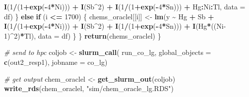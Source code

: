 \documentclass[12pt, twoside]{amherstthesis}
\newenvironment{Shaded}{\begin{snugshade}}{\end{snugshade}}
\newcommand{\AttributeTok}[1]{\textcolor[rgb]{0.13,0.29,0.53}{#1}}
\newcommand{\CommentTok}[1]{\textcolor[rgb]{0.56,0.35,0.01}{\textit{#1}}}
\newcommand{\ControlFlowTok}[1]{\textcolor[rgb]{0.13,0.29,0.53}{\textbf{#1}}}
\newcommand{\DecValTok}[1]{\textcolor[rgb]{0.00,0.00,0.81}{#1}}
\newcommand{\FunctionTok}[1]{\textcolor[rgb]{0.13,0.29,0.53}{\textbf{#1}}}
\newcommand{\NormalTok}[1]{#1}
\newcommand{\OtherTok}[1]{\textcolor[rgb]{0.56,0.35,0.01}{#1}}
\newcommand{\SpecialCharTok}[1]{\textcolor[rgb]{0.81,0.36,0.00}{\textbf{#1}}}
\newcommand{\StringTok}[1]{\textcolor[rgb]{0.31,0.60,0.02}{#1}}
\begin{document}
\begin{Shaded}
\begin{Highlighting}[]
                                \FunctionTok{I}\NormalTok{(}\DecValTok{1}\SpecialCharTok{/}\NormalTok{(}\DecValTok{1}\SpecialCharTok{+}\FunctionTok{exp}\NormalTok{(}\SpecialCharTok{{-}}\DecValTok{4}\SpecialCharTok{*}\NormalTok{Ni))) }\SpecialCharTok{+} \FunctionTok{I}\NormalTok{(Sb}\SpecialCharTok{\^{}}\DecValTok{2}\NormalTok{) }\SpecialCharTok{+} \FunctionTok{I}\NormalTok{(}\DecValTok{1}\SpecialCharTok{/}\NormalTok{(}\DecValTok{1}\SpecialCharTok{+}\FunctionTok{exp}\NormalTok{(}\SpecialCharTok{{-}}\DecValTok{4}\SpecialCharTok{*}\NormalTok{Sn))) }\SpecialCharTok{+}
\NormalTok{                                Hg}\SpecialCharTok{:}\NormalTok{Ni}\SpecialCharTok{:}\NormalTok{Tl, }\AttributeTok{data =}\NormalTok{ df)}
\NormalTok{    \} }\ControlFlowTok{else} \ControlFlowTok{if}\NormalTok{ (i }\SpecialCharTok{\textless{}=} \DecValTok{1700}\NormalTok{) \{}
\NormalTok{      chems\_oraclel[[i]] }\OtherTok{\textless{}{-}} \FunctionTok{lm}\NormalTok{(y }\SpecialCharTok{\textasciitilde{}}\NormalTok{ Hg }\SpecialCharTok{+}\NormalTok{ Sb }\SpecialCharTok{+}
                                \FunctionTok{I}\NormalTok{(}\DecValTok{1}\SpecialCharTok{/}\NormalTok{(}\DecValTok{1}\SpecialCharTok{+}\FunctionTok{exp}\NormalTok{(}\SpecialCharTok{{-}}\DecValTok{4}\SpecialCharTok{*}\NormalTok{Ni))) }\SpecialCharTok{+} \FunctionTok{I}\NormalTok{(Sb}\SpecialCharTok{\^{}}\DecValTok{2}\NormalTok{) }\SpecialCharTok{+} \FunctionTok{I}\NormalTok{(}\DecValTok{1}\SpecialCharTok{/}\NormalTok{(}\DecValTok{1}\SpecialCharTok{+}\FunctionTok{exp}\NormalTok{(}\SpecialCharTok{{-}}\DecValTok{4}\SpecialCharTok{*}\NormalTok{Sn))) }\SpecialCharTok{+}
                                \FunctionTok{I}\NormalTok{(Hg}\SpecialCharTok{*}\NormalTok{((Ni}\DecValTok{{-}1}\NormalTok{)}\SpecialCharTok{\^{}}\DecValTok{2}\NormalTok{)}\SpecialCharTok{*}\NormalTok{Tl), }\AttributeTok{data =}\NormalTok{ df)}
\NormalTok{    \}}
\NormalTok{  \}}
  \FunctionTok{return}\NormalTok{(chems\_oraclel)}
\NormalTok{\}}

\CommentTok{\# send to hpc}
\NormalTok{coljob }\OtherTok{\textless{}{-}} \FunctionTok{slurm\_call}\NormalTok{(}
\NormalTok{  run\_co\_lg, }
  \AttributeTok{global\_objects =} \FunctionTok{c}\NormalTok{(}\StringTok{\textquotesingle{}out2\_resp1\textquotesingle{}}\NormalTok{),}
  \AttributeTok{jobname =} \StringTok{\textquotesingle{}co\_lg\textquotesingle{}}\NormalTok{)}

\CommentTok{\# get output}
\NormalTok{chem\_oraclel }\OtherTok{\textless{}{-}} \FunctionTok{get\_slurm\_out}\NormalTok{(coljob)}
\FunctionTok{write\_rds}\NormalTok{(chem\_oraclel, }\StringTok{"sim/chem\_oracle\_lg.RDS"}\NormalTok{)}
\end{Highlighting}
\end{Shaded}
\normalsize
\end{document}

